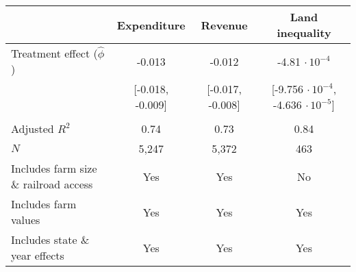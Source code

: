 	\begin{tabular}{@{}lccc@{}}
		\toprule
		& Expenditure             & Revenue                 & Land inequality \\ \midrule
		Treatment effect ($\hat{\phi}$) & -0.013  &  -0.012  &   -4.81 $\cdot\,10^{-4}$        \\
										 &  [-0.018, -0.009] &  [-0.017, -0.008] &   [-9.756 $\cdot\,10^{-4}$, -4.636 $\cdot\,10^{-5}$]         \\
									  &                   &                    &          \\
		Adjusted $R^2$                           & 0.74                    & 0.73                    &   0.84         \\
		$N$                             & 5,247                   & 5,372                  &  463          \\
		Includes farm size \& railroad access                      & Yes                  & Yes                 &  No         \\
		Includes farm values                      & Yes                  & Yes                 &  Yes         \\
		Includes state \& year effects               & Yes                  & Yes                 &  Yes         \\
		 \bottomrule
	\end{tabular}
